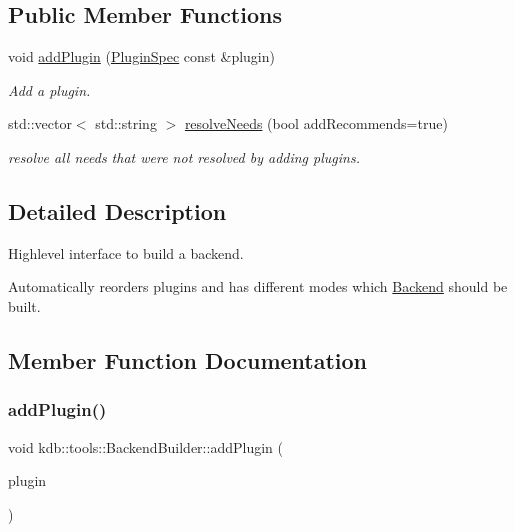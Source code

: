 \subsection*{Public Member Functions}
\begin{DoxyCompactItemize}
\item 
void \hyperlink{classkdb_1_1tools_1_1BackendBuilder_a987d2c3711399e24b42c38e652c0e1c4}{add\+Plugin} (\hyperlink{classkdb_1_1tools_1_1PluginSpec}{Plugin\+Spec} const \&plugin)
\begin{DoxyCompactList}\small\item\em Add a plugin. \end{DoxyCompactList}\item 
std\+::vector$<$ std\+::string $>$ \hyperlink{classkdb_1_1tools_1_1BackendBuilder_a6e6c23716dc72ef68f8acfd71fc802a9}{resolve\+Needs} (bool add\+Recommends=true)
\begin{DoxyCompactList}\small\item\em resolve all needs that were not resolved by adding plugins. \end{DoxyCompactList}\end{DoxyCompactItemize}


\subsection{Detailed Description}
Highlevel interface to build a backend. 

Automatically reorders plugins and has different modes which \hyperlink{classkdb_1_1tools_1_1Backend}{Backend} should be built. 

\subsection{Member Function Documentation}
\mbox{\label{classkdb_1_1tools_1_1BackendBuilder_a987d2c3711399e24b42c38e652c0e1c4}} 
\subsubsection{\texorpdfstring{add\+Plugin()}{addPlugin()}}
{\footnotesize\ttfamily void kdb\+::tools\+::\+Backend\+Builder\+::add\+Plugin (\begin{DoxyParamCaption}\item[{\hyperlink{classkdb_1_1tools_1_1PluginSpec}{Plugin\+Spec} const \&}]{plugin }\end{DoxyParamCaption})\hspace{0.3cm}{\ttfamily [virtual]}}



